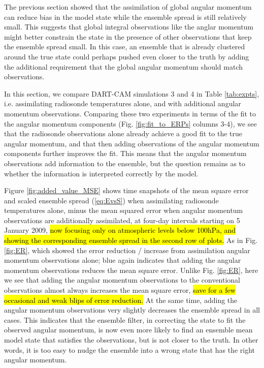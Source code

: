 

The previous section showed that the assimilation of global angular momentum can reduce bias in the model state while the ensemble spread is still relatively small.
This suggests that global integral observations like the anglar momentum might better constrain the state in the presence of other observations that keep the ensemble spread small. 
In this case, an ensemble that is already clustered around the true state could perhaps pushed even closer to the truth by adding the additional requirement that the global angular momentum should match observations. 

In this section, we compare DART-CAM simulations 3 and 4 in Table \ref{tab:expts}, i.e. assimilating radiosonde temperatures alone, and with additional angular momentum observations.
Comparing these two experiments in terms of the fit to the angular momentum components (Fig. \ref{fig:fit_to_ERPs} columns 3-4), we see that the radiosonde observations alone already achieve a good fit to the true angular momentum, and that 
then adding observations of the angular momentum components further improves the fit.  
This means that the angular momentum observations add information to the ensemble, but the question remains as to whether the information is interpreted correctly by the model.

Figure \ref{fig:added_value_MSE} shows time snapshots of the mean square error and scaled ensemble spread (\ref{eq:EvsS}) when assimilating radiosonde temperatures alone, minus the mean squared error when angular momentum observations are additionally assimilated, at four-day intervals starting on 5 January 2009, \hl{now focusing only on atmospheric levels below 100hPa, and showing the corresponding ensemble spread in the second row of plots.} 
As in Fig. \ref{fig:ER}, which showed the error reduction / increase from assimilation angular momentum observations alone; blue again indicates that adding the angular momentum observations reduces the mean square error. 
Unlike Fig. \ref{fig:ER}, here we see that adding the angular momentum observations to the conventional observations almost always increases the mean square error, \hl{save for a few occasional and weak blips of error reduction.}
At the same time, adding the angular momentum observations very slightly decreases the ensemble spread in all cases.
This indicates that the ensemble filter, in correcting the state to fit the observed angular momentum, is now even more likely to find an ensemble mean model state that satisfies the observations, but is not closer to the truth. 
In other words, it is too easy to nudge the ensemble into a wrong state that has the right angular momentum. 

